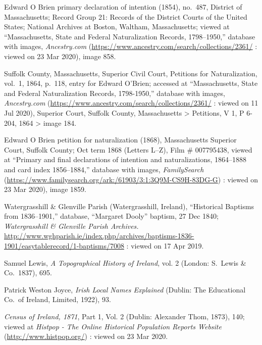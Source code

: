 \textbf{}\begin{thebibliography}{999}
\raggedright
\small

	Edward O Brien primary declaration of intention (1854), no.\ 487, 
	District of Massachusetts; 
	Record Group 21: Records of the District Courts of the United States; 
	National Archives at Boston, Waltham, Massachusetts;
	viewed at ``Massachusetts, State and Federal Naturalization Records, 1798--1950,''
	database with images, \textit{Ancestry.com} (\url{https://www.ancestry.com/search/collections/2361/} : viewed on 23 Mar 2020), image 858.
	
	Suffolk County, Massachusetts, Superior Civil Court, Petitions for Naturalization, vol.\ 1, 1864, p.\ 118, entry for Edward O'Brien; accessed at ``Massachusetts, State and Federal Naturalization Records, 1798-1950,'' database with images, \textit{Ancestry.com} (\url{https://www.ancestry.com/search/collections/2361/} : viewed on 11 Jul 2020), Superior Court, Suffolk County, Massachusetts > Petitions, V 1, P 6-204, 1864 > image 184.
	
	Edward O Brien petition for naturalization (1868), 
	Massachusetts Superior Court, Suffolk County; 
	Oct term 1868 (Letters L--Z), Film \# 007795438,
	viewed at ``Primary and final declarations of intention and naturalizations, 1864--1888 and card index 1856--1884,''
	database with images, \textit{FamilySearch} (\url{https://www.familysearch.org/ark:/61903/3:1:3Q9M-CS9H-83DG-G}) : viewed on 23 Mar 2020), image 1859.
	
	Watergrasshill \& Glenville Parish (Watergrasshill, Ireland), ``Historical Baptisms from 1836--1901,'' database, ``Margaret Dooly'' baptism, 27 Dec 1840; \textit{Watergrasshill \& Glenville Parish Archives.} \url{http://www.wghparish.ie/index.php/archives/baptisms-1836-1901/easytablerecord/1-baptisms/7008} : viewed on 17 Apr 2019.
	
	Samuel Lewis, \textit{A Topographical History of Ireland}, vol. 2 (London: S.\ Lewis \& Co.\, 1837), 695.
	
	Patrick Weston Joyce, \textit{Irish Local Names Explained} (Dublin: The Educational Co.\ of Ireland, Limited, 1922), 93.
	
	\textit{Census of Ireland, 1871}, Part 1, Vol. 2 (Dublin: Alexander Thom, 1873), 140; viewed at \textit{Histpop - The Online Historical Population Reports Website} (\url{http://www.histpop.org/}) : viewed on 23 Mar 2020.
	

\end{thebibliography}
